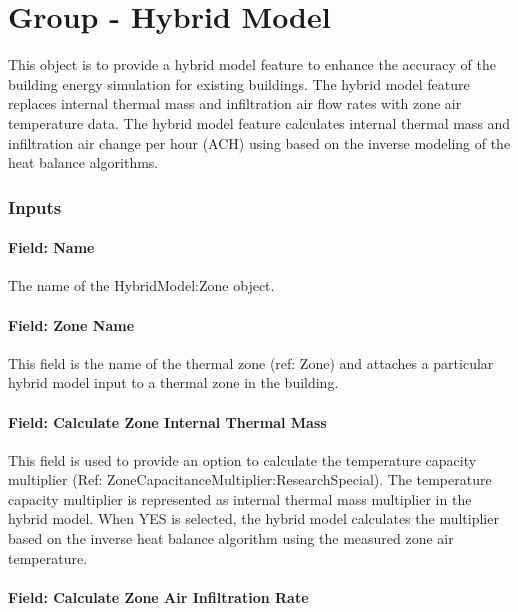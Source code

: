 \section{Group - Hybrid Model}\label{group---hybrid-model}

This object is to provide a hybrid model feature to enhance the accuracy of the building energy simulation for existing buildings. The hybrid model feature replaces internal thermal mass and infiltration air flow rates with zone air temperature data. The hybrid model feature calculates internal thermal mass and infiltration air change per hour (ACH) using based on the inverse modeling of the heat balance algorithms. 

\subsubsection{Inputs}\label{inputs-hm}

\paragraph{Field: Name}\label{field-name-hm}

The name of the HybridModel:Zone object.

\paragraph{Field: Zone Name}\label{field-zone-name-hm}

This field is the name of the thermal zone (ref: Zone) and attaches a particular hybrid model input to a thermal zone in the building.

\paragraph{Field: Calculate Zone Internal Thermal Mass}\label{field-calculate-zon-internal-thermal-mass-hm}

This field is used to provide an option to calculate the temperature capacity multiplier (Ref: ZoneCapacitanceMultiplier:ResearchSpecial). The temperature capacity multiplier is represented as internal thermal mass multiplier in the hybrid model. 
When YES is selected, the hybrid model calculates the multiplier based on the inverse heat balance algorithm using the measured zone air temperature.

\paragraph{Field: Calculate Zone Air Infiltration Rate}\label{field-calculate-zone-air-fnfiltration-rate-hm}

